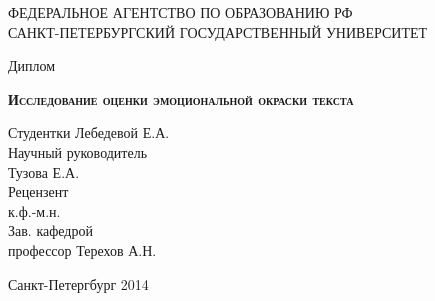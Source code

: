 \begin{titlepage}
\newpage

\begin{center}
ФЕДЕРАЛЬНОЕ АГЕНТСТВО ПО ОБРАЗОВАНИЮ РФ \\
\vspace{1cm}
САНКТ-ПЕТЕРБУРГСКИЙ ГОСУДАРСТВЕННЫЙ УНИВЕРСИТЕТ \\
\hrulefill
\end{center}



\vspace{8em}

\begin{center}
\Large Диплом
\end{center}

\vspace{2.5.em}

\begin{center}
\textsc{\textbf{Исследование оценки эмоциональной окраски текста}}
\end{center}

\vspace{6em}

\begin{flushleft}
Студентки \hrulefill Лебедевой Е.А.\\
\vspace{1.5em}
Научный руководитель \\
Тузова Е.А.\\
Рецензент \\
к.ф.-м.н.\\
\vspace{1.5em}
Зав. кафедрой \\
профессор \hrulefill Терехов А.Н.
\end{flushleft}

\vspace{\fill}

\begin{center}
Санкт-Петергбург 2014
\end{center}

\end{titlepage}
